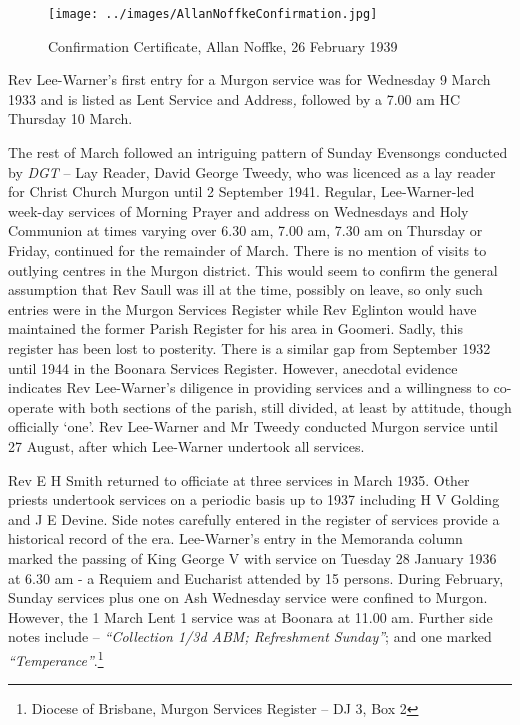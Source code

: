 \begin{figure}[!htb]
\begin{center}
\texttt{[image: ../images/AllanNoffkeConfirmation.jpg]}
\caption{Confirmation Certificate, Allan Noffke, 26 February 1939}
\end{center}
\end{figure}




Rev Lee-Warner's first entry for a Murgon service was for Wednesday 9 March 1933 and is listed as Lent Service and Address\emph{,} followed by a 7.00 am HC Thursday 10 March.



The rest of March followed an intriguing pattern of Sunday Evensongs conducted by \emph{DGT} -- Lay Reader, David George Tweedy, who was licenced as a lay reader for Christ Church Murgon until 2 September 1941. Regular, Lee-Warner-led week-day services of Morning Prayer and address on Wednesdays and Holy Communion at times varying over 6.30 am, 7.00 am, 7.30 am on Thursday or Friday, continued for the remainder of March. There is no mention of visits to outlying centres in the Murgon district. This would seem to confirm the general assumption that Rev Saull was ill at the time, possibly on leave, so only such entries were in the Murgon Services Register while Rev Eglinton would have maintained the former Parish Register for his area in Goomeri. Sadly, this register has been lost to posterity. There is a similar gap from September 1932 until 1944 in the Boonara Services Register. However, anecdotal evidence indicates Rev Lee-Warner's diligence in providing services and a willingness to co-operate with both sections of the parish, still divided, at least by attitude, though officially `one'. Rev Lee-Warner and Mr Tweedy conducted Murgon service until 27 August, after which Lee-Warner undertook all services.



Rev E H Smith returned to officiate at three services in March 1935. Other priests undertook services on a periodic basis up to 1937 including H V Golding and J E Devine. Side notes carefully entered in the register of services provide a historical record of the era. Lee-Warner's entry in the Memoranda column marked the passing of King George V with service on Tuesday 28 January 1936 at 6.30 am - a Requiem and Eucharist attended by 15 persons. During February, Sunday services plus one on Ash Wednesday service were confined to Murgon. However, the 1 March Lent 1 service was at Boonara at 11.00 am. Further side notes include -- \emph{``Collection 1/3d ABM; Refreshment Sunday''}; and one marked \emph{``Temperance''}.\footnote{Diocese of Brisbane, Murgon Services Register -- DJ 3, Box 2}



